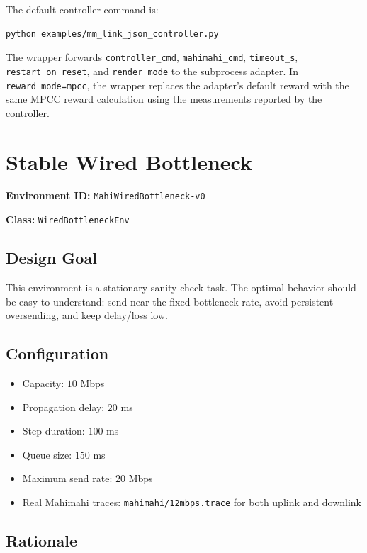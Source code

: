 \documentclass[11pt]{article}
\begin{document}
The default controller command is:

\begin{verbatim}
python examples/mm_link_json_controller.py
\end{verbatim}

The wrapper forwards \texttt{controller\_cmd}, \texttt{mahimahi\_cmd},
\texttt{timeout\_s}, \texttt{restart\_on\_reset}, and \texttt{render\_mode} to
the subprocess adapter. In \texttt{reward\_mode=mpcc}, the wrapper replaces the
adapter's default reward with the same MPCC reward calculation using the
measurements reported by the controller.

\section{Stable Wired Bottleneck}

\textbf{Environment ID:} \texttt{MahiWiredBottleneck-v0}

\textbf{Class:} \texttt{WiredBottleneckEnv}

\subsection{Design Goal}

This environment is a stationary sanity-check task. The optimal behavior should
be easy to understand: send near the fixed bottleneck rate, avoid persistent
oversending, and keep delay/loss low.

\subsection{Configuration}

\begin{itemize}
  \item Capacity: \(10\) Mbps
  \item Propagation delay: \(20\) ms
  \item Step duration: \(100\) ms
  \item Queue size: \(150\) ms
  \item Maximum send rate: \(20\) Mbps
  \item Real Mahimahi traces: \texttt{mahimahi/12mbps.trace} for both uplink
        and downlink
\end{itemize}

\subsection{Rationale}
\end{document}
